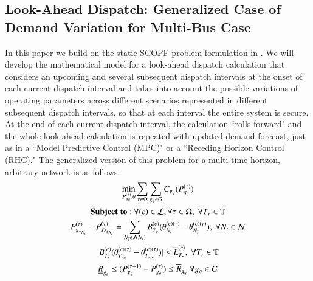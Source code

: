 \documentclass[preprint,12pt,3p]{elsarticle}
\begin{document}
	\subsection{Look-Ahead Dispatch: Generalized Case of Demand Variation for Multi-Bus Case}
	In this paper we build on the static SCOPF problem formulation in \cite{CK:14}. We will develop the mathematical model for a look-ahead dispatch calculation that considers an upcoming and several subsequent dispatch intervals at the onset of each current dispatch interval and takes into account the possible variations of operating parameters across different scenarios represented in different subsequent dispatch intervals, so that at each interval the entire system is secure. At the end of each current dispatch interval, the calculation ``rolls forward" and the whole look-ahead calculation is repeated with updated demand forecast, just as in a ``Model Predictive Control (MPC)" or a ``Receding Horizon Control (RHC)." The generalized version of this problem for a multi-time horizon, arbitrary network is as follows:
	\begin{subequations}\label{Look-Ahead_General_Ang_Inc}
		\begin{gather}
		\min_{P_{g_q}^{(\tau)},\theta}\sum_{\tau\in \Omega}\sum_{g_q\in G}C_{g_q}(P_{g_q}^{(\tau)})\label{first_Look-Ahead_General_Ang_Inc}\\
		\mathbf{Subject\;to:}\:\forall(c)\in\mathcal{L},\forall \tau \in \Omega,\;\forall T_r\in \mathbb{T}\notag\\
		P_{{g_q}_{N_i}}^{(\tau)}-P_{{D_d}_{N_i}}^{(\tau)}=\sum_{N_{\overline{i}}\in{J(N_i)}}B_{T_r}^{(c)}(\theta_{N_i}^{(c)(\tau)}-\theta_{N_{\overline{i}}}^{(c)(\tau)});\ \forall{{N_i}\in\mathcal{N}}\label{second I_Look-Ahead_General_Ang_Inc}\\
		|B_{T_r}^{(c)}(\theta_{{T_r}_{t_1}}^{(c)(\tau)}-\theta_{{T_r}_{t_2}}^{(c)(\tau)})|\leq{{\overline{L}}_{T_r}^{(c)}},\;\forall{T_r\in{\mathbb{T}}}\label{fourth_Look-Ahead_General_Ang_Inc}\\
		\underline{R}_{g_q}\leq(P_{g_q}^{(\tau+1)}-P_{g_q}^{(\tau)})\leq \overline{R}_{g_q}\; \forall {g_q}\in G\label{fifth_Look-Ahead_General_Ang_Inc}
		\end{gather}
	\end{subequations}
\end{document}
